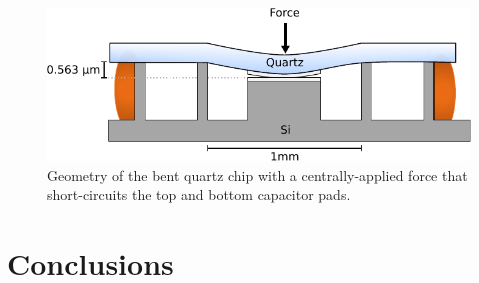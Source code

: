 \documentclass[double,12pt,1in]{beavtex}
\begin{document}
\begin{figure}
    \includegraphics[width = 1\textwidth]{quartz bending.pdf}
    \caption{Geometry of the bent quartz chip with a centrally-applied force that short-circuits the top and bottom capacitor pads.}
    \label{quartz bending}
\end{figure}


\section{Conclusions}
\end{document}
